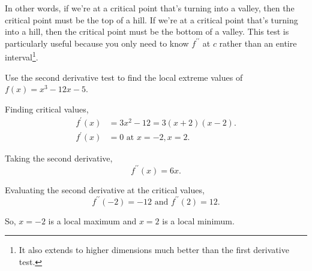 In other words, if we're at a critical point that's turning into a valley, then the critical point must be the top of a hill.
If we're at a critical point that's turning into a hill, then the critical point must be the bottom of a valley.
This test is particularly useful because you only need to know $f^{\prime\prime}$ at $c$ rather than an entire interval\footnote{It also extends to higher dimensions much better than the first derivative test.}.

\begin{example}
	Use the second derivative test to find the local extreme values of $f(x) = x^3 - 12x - 5$.
\end{example}
\begin{answer}
	Finding critical values,
	\begin{align*}
		f^\prime(x) &= 3x^2 - 12 = 3(x+2)(x-2). \\
		f^\prime(x) &= 0\text{ at } x=-2, x=2.
	\end{align*}
	
	Taking the second derivative,
	\begin{equation*}
		f^{\prime\prime}(x) = 6x.
	\end{equation*}
	
	Evaluating the second derivative at the critical values,
	\begin{equation*}
		f^{\prime\prime}(-2) = -12 \text{ and } f^{\prime\prime}(2) = 12.
	\end{equation*}
	
	So, $x=-2$ is a local maximum and $x=2$ is a local minimum.
\end{answer}